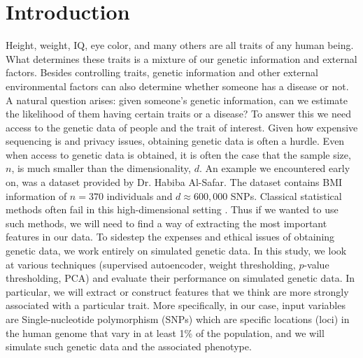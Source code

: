 \documentclass{article}
\begin{document}
\section{Introduction}
Height, weight, IQ, eye color, and many others are all traits of any human being. What determines these traits is a mixture of our genetic information and external factors. Besides controlling traits, genetic information and other external environmental factors can also determine whether someone has a disease or not. A natural question arises: given someone's genetic information, can we estimate the likelihood of them having certain traits or a disease? To answer this we need access to the genetic data of people and the trait of interest. Given how expensive sequencing is and privacy issues, obtaining genetic data is often a hurdle. Even when access to genetic data is obtained, it is often the case that the sample size, $n$, is much smaller than the dimensionality, $d.$ An example we encountered early on, was a dataset provided by Dr. Habiba Al-Safar. The dataset contains BMI information of $n=370$ individuals and $d\approx600,000$ SNPs. Classical statistical methods often fail in this high-dimensional setting \cite{wainright}. Thus if we wanted to use such methods, we will need to find a way of extracting the most important features in our data. To sidestep the expenses and ethical issues of obtaining genetic data, we work entirely on simulated genetic data. In this study, we look at various techniques (supervised autoencoder, weight thresholding, $p$-value thresholding, PCA) and evaluate their performance on simulated genetic data. In particular, we will extract or construct features that we think are more strongly associated with a particular trait. More specifically, in our case, input variables are Single-nucleotide polymorphism (SNPs) which are specific locations (loci) in the human genome that vary in at least 1\% of the population, and we will simulate such genetic data and the associated phenotype.
\end{document}
